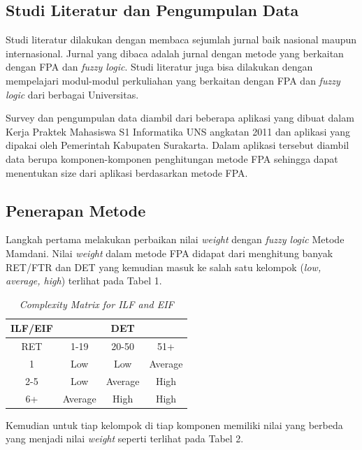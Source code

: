\documentclass[a4paper]{article}
\begin{document}
\begin{multicols}{2}
\subsection{Studi Literatur dan Pengumpulan Data}

\par Studi literatur dilakukan dengan membaca sejumlah jurnal baik nasional maupun internasional. Jurnal yang dibaca adalah jurnal dengan metode yang berkaitan dengan FPA dan \textit{fuzzy logic}. Studi literatur juga bisa dilakukan dengan mempelajari modul-modul perkuliahan yang berkaitan dengan FPA dan \textit{fuzzy logic} dari berbagai Universitas. 

\par Survey dan pengumpulan data diambil dari beberapa aplikasi yang dibuat dalam Kerja Praktek Mahasiswa S1 Informatika UNS angkatan 2011 dan aplikasi yang dipakai oleh Pemerintah Kabupaten Surakarta. Dalam aplikasi tersebut diambil data berupa komponen-komponen penghitungan metode FPA sehingga dapat menentukan size dari aplikasi berdasarkan metode FPA.

\subsection{Penerapan Metode}

\par Langkah pertama melakukan perbaikan nilai \textit{weight} dengan \textit{fuzzy logic} Metode Mamdani. Nilai \textit{weight} dalam metode FPA didapat dari menghitung banyak RET/FTR dan DET yang kemudian masuk ke salah satu kelompok (\textit{low, average, high}) terlihat pada Tabel 1.

\begin{table}[H]
    \centering
    \caption{\textit{Complexity Matrix for ILF and EIF} \citep{Jones2008}}
    \bigskip
    \begin{tabular}{|c|c|c|c|}
        \hline
        \textbf{ILF/EIF} & \multicolumn{3}{|c|}{DET}\\
        \hline
        RET & 1-19 & 20-50 & 51+\\
        1 & Low & Low & Average\\
        2-5 & Low & Average & High\\
        6+ & Average & High & High\\
        \hline
    \end{tabular}
    \label{tab1}
\end{table}

\par Kemudian untuk tiap kelompok di tiap komponen memiliki nilai yang berbeda yang menjadi nilai \textit{weight} seperti terlihat pada Tabel 2.


\end{multicols}
\end{document}
